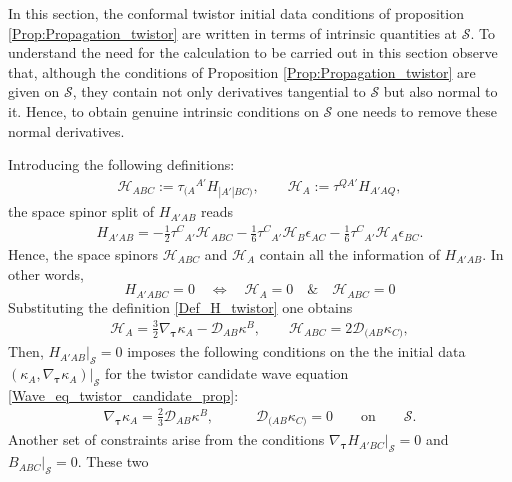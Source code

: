 \documentclass[10pt,a4paper]{article}
\theoremstyle{plain}
\begin{document}
In this section, the conformal twistor initial data conditions of
proposition \ref{Prop:Propagation_twistor} are written in terms of
intrinsic quantities at $\mathcal{S}$.  To understand the need for the
calculation to be carried out in this section observe that, although
the conditions of Proposition \ref{Prop:Propagation_twistor} are given
on $\mathcal{S}$, they contain not only derivatives tangential to
$\mathcal{S}$ but also normal to it. Hence, to obtain genuine
intrinsic conditions on $\mathcal{S}$ one needs to remove these normal
derivatives.

\medskip

Introducing the following definitions:
\begin{align}
  \mathcal{H} _{ABC}  := \tau _{(A}{}^{A'}H_{|A'|BC)}, \qquad
  \mathcal{H}_{A}  :=  \tau^{QA'} H_{A'AQ},
\end{align}
the space spinor split of $H_{A'AB}$ reads
\begin{align}
  H_{A'AB} = - \tfrac{1}{2} \tau ^{C}{}_{A'} \mathcal{H} _{ABC}  -
  \tfrac{1}{6} \tau ^{C}{}_{A'} \mathcal{H} _{B} \epsilon _{AC}  -
  \tfrac{1}{6} \tau ^{C}{}_{A'} \mathcal{H} _{A} \epsilon _{BC}.
\end{align}
Hence, the space spinors $\mathcal{H} _{ABC}$ and $\mathcal{H}_{A}$
contain all the information of $H_{A'AB}$. In other words,
\[
H_{A'ABC}=0 \quad                 
\iff \quad \mathcal{H} _{A}=0    
\quad
\& \quad \mathcal{H}_{ABC}=0  
\]
Substituting the definition \eqref{Def_H_twistor} one obtains
\begin{align}\label{spacespinordecompHtotwistorders}
\mathcal{H} _{A} = \tfrac{3}{2} \nabla_{\bm\tau} \kappa_{A} - \mathcal{D} _{AB}\kappa^{B}, \qquad \mathcal{H} _{ABC} = 2 \mathcal{D} _{(AB}\kappa _{C)},
\end{align}
Then, $H_{A'AB}|_{\mathcal{S}}=0$  imposes the
following conditions on the
the initial data
$(\kappa_A,\nabla_{\bm\tau}\kappa_A)|_{\mathcal{S}}$
for the twistor candidate wave equation
\eqref{Wave_eq_twistor_candidate_prop}:
\begin{align}\label{H_twistor_vanishes_ID}
 \nabla_{\bm\tau} \kappa _{A} = \tfrac{2}{3} \mathcal{D} _{AB}\kappa ^{B}, \qquad
 \quad \mathcal{D} _{(AB}\kappa _{C)}=0 \qquad \text{on} \qquad \mathcal{S}.
\end{align}
Another set of constraints arise from the conditions $\nabla_{\bm\tau}
H_{A'BC}|_{\mathcal{S}}=0$ and $B_{ABC}|_{\mathcal{S}}=0$. These two
\end{document}
